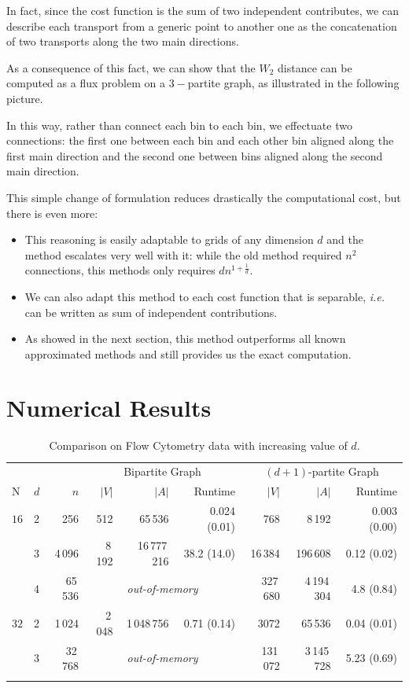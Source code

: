 \documentclass[al, 27pt, plainboxedsections, landscape]{sciposter}
\begin{document}
\begin{multicols}{3}
In fact, since the cost function is the sum of two independent contributes, we can describe each transport from a generic point to another one as the concatenation of two transports along the two main directions.

As a consequence of this fact, we can show that the $W_2$ distance can be computed as a flux problem on a $3-$partite graph, as illustrated in the following picture.



In this way, rather than connect each bin to each bin, we effectuate two connections: the first one between each bin and each other bin aligned along the first main direction and the second one between bins aligned along the second main direction.\newline

This simple change of formulation reduces drastically the computational cost, but there is even more:
\begin{itemize}
	\item This reasoning is easily adaptable to grids of any dimension $d$ and the method escalates very well with it: while the old method required $n^2$ connections, this methods only requires $dn^{1+\frac{1}{d}}$.
	\item We can also adapt this method to each cost function that is separable, \emph{i.e.} can be written as sum of independent contributions.
	\item  As showed in the next section, this method outperforms all known approximated methods and still provides us the exact computation.
\end{itemize}


\section{Numerical Results}

\begin{table}
\caption{Comparison on Flow Cytometry data with increasing value of $d$.}
	\label{tab:3}
\centering
{\renewcommand{\arraystretch}{1.2}
\begin{tabular}{llrrrrrrr}
     & & & \multicolumn{3}{c}{Bipartite Graph} & \multicolumn{3}{c}{$(d+1)$-partite Graph} \\
N & $d$ & $n$ & $|V|$ & $|A|$ & Runtime & $|V|$ & $|A|$ & Runtime  \\
\hline
$16$ & 2 & 256 & 512 & 65\,536 & 0.024 (0.01) & 768 & 8\,192 & 0.003 (0.00) \\
& 3 & 4\,096 & 8\,192 & 16\,777\,216& 38.2 (14.0)   & 16\,384 & 196\,608& 0.12 (0.02)  \\
& 4 & 65\,536 & \multicolumn{3}{c}{{\it out-of-memory}} & 327\,680 & 4\,194\,304& 4.8 (0.84) \\
 \hline\noalign{\smallskip}
$32$ & 2 & 1\,024 & 2\,048 & 1\,048\,756 & 0.71 (0.14) & 3072 & 65\,536& 0.04 (0.01) \\
& 3 & 32\,768& \multicolumn{3}{c}{{\it out-of-memory}}   & 131\,072 & 3\,145\,728& 5.23 (0.69)  \\
 \hline\noalign{\smallskip}
 \end{tabular}}
\end{table}


\end{multicols}
\end{document}
